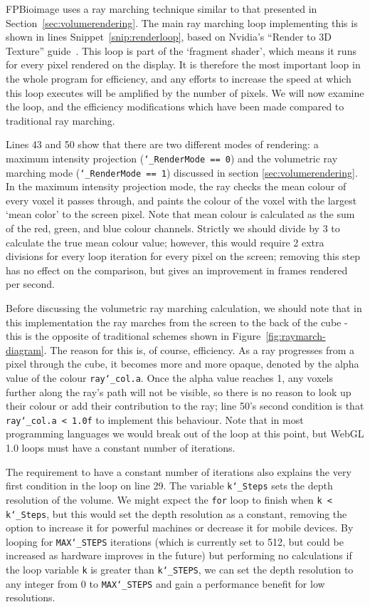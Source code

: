 FPBioimage uses a ray marching technique similar to that presented in Section~\ref{sec:volumerendering}.
The main ray marching loop implementing this is shown in lines Snippet~\ref{snip:renderloop}, based on Nvidia's ``Render to 3D Texture'' guide~\cite{nvidia2008guide}.
This loop is part of the `fragment shader', which means it runs for every pixel rendered on the display.
It is therefore the most important loop in the whole program for efficiency, and any efforts to increase the speed at which this loop executes will be amplified by the number of pixels.
We will now examine the loop, and the efficiency modifications which have been made compared to traditional ray marching.

Lines 43 and 50 show that there are two different modes of rendering: a maximum intensity projection (\texttt{\char`_RenderMode == 0}) and the volumetric ray marching mode (\texttt{\char`_RenderMode == 1}) discussed in section \ref{sec:volumerendering}.
In the maximum intensity projection mode, the ray checks the mean colour of every voxel it passes through, and paints the colour of the voxel with the largest `mean color' to the screen pixel.
Note that mean colour is calculated as the sum of the red, green, and blue colour channels.
Strictly we should divide by $3$ to calculate the true mean colour value; however, this would require 2 extra divisions for every loop iteration for every pixel on the screen; removing this step has no effect on the comparison, but gives an improvement in frames rendered per second.

Before discussing the volumetric ray marching calculation, we should note that in this implementation the ray marches from the screen to the back of the cube - this is the opposite of traditional schemes shown in Figure~\ref{fig:raymarch-diagram}.
The reason for this is, of course, efficiency.
As a ray progresses from a pixel through the cube, it becomes more and more opaque, denoted by the alpha value of the colour \texttt{ray\char`_col.a}.
Once the alpha value reaches 1, any voxels further along the ray's path will not be visible, so there is no reason to look up their colour or add their contribution to the ray; line 50's second condition is that \texttt{ray\char`_col.a < 1.0f} to implement this behaviour.
Note that in most programming languages we would break out of the loop at this point, but WebGL 1.0 loops must have a constant number of iterations.

The requirement to have a constant number of iterations also explains the very first condition in the loop on line 29.
The variable \texttt{k\char`_Steps} sets the depth resolution of the volume.
We might expect the \texttt{for} loop to finish when \texttt{k < k\char`_Steps}, but this would set the depth resolution as a constant, removing the option to increase it for powerful machines or decrease it for mobile devices.
By looping for \texttt{MAX\char`_STEPS} iterations (which is currently set to 512, but could be increased as hardware improves in the future) but performing no calculations if the loop variable \texttt{k} is greater than \texttt{k\char`_STEPS}, we can set the depth resolution to any integer from 0 to \texttt{MAX\char`_STEPS} and gain a performance benefit for low resolutions.

